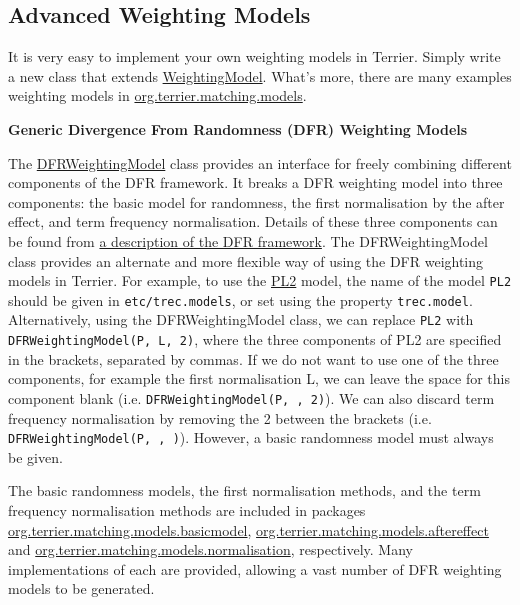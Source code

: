 \subsection{Advanced Weighting Models}\label{advanced-weighting-models}

It is very easy to implement your own weighting models in Terrier.
Simply write a new class that extends
\href{javadoc/org/terrier/matching/models/WeightingModel.html}{WeightingModel}.
What's more, there are many examples weighting models in
\href{javadoc/org/terrier/matching/models/package-summary.html}{org.terrier.matching.models}.

\textbf{Generic Divergence From Randomness (DFR) Weighting Models}

The
\href{javadoc/org/terrier/matching/models/DFRWeightingModel.html}{DFRWeightingModel}
class provides an interface for freely combining different components of
the DFR framework. It breaks a DFR weighting model into three
components: the basic model for randomness, the first normalisation by
the after effect, and term frequency normalisation. Details of these
three components can be found from \href{dfr_description.html}{a
description of the DFR framework}. The DFRWeightingModel class provides
an alternate and more flexible way of using the DFR weighting models in
Terrier. For example, to use the
\href{javadoc/org/terrier/matching/models/PL2.html}{PL2} model, the name
of the model \texttt{PL2} should be given in \texttt{etc/trec.models},
or set using the property \texttt{trec.model}. Alternatively, using the
DFRWeightingModel class, we can replace \texttt{PL2} with
\texttt{DFRWeightingModel(P,\ L,\ 2)}, where the three components of PL2
are specified in the brackets, separated by commas. If we do not want to
use one of the three components, for example the first normalisation L,
we can leave the space for this component blank (i.e.
\texttt{DFRWeightingModel(P,\ ,\ 2)}). We can also discard term
frequency normalisation by removing the 2 between the brackets (i.e.
\texttt{DFRWeightingModel(P,\ ,\ )}). However, a basic randomness model
must always be given.

The basic randomness models, the first normalisation methods, and the
term frequency normalisation methods are included in packages
\href{javadoc/org/terrier/matching/models/basicmodel/package-summary.html}{org.terrier.matching.models.basicmodel},
\href{javadoc/org/terrier/matching/models/aftereffect/package-summary.html}{org.terrier.matching.models.aftereffect}
and
\href{javadoc/org/terrier/matching/models/normalisation/package-summary.html}{org.terrier.matching.models.normalisation},
respectively. Many implementations of each are provided, allowing a vast
number of DFR weighting models to be generated.


